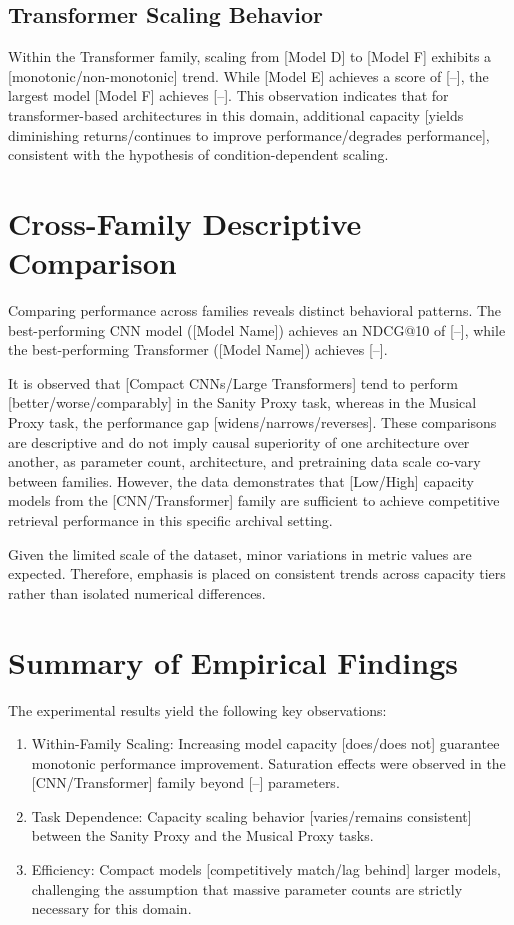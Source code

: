 \subsection{Transformer Scaling Behavior}
Within the Transformer family, scaling from [Model D] to [Model F] exhibits a [monotonic/non-monotonic] trend. While [Model E] achieves a score of [--], the largest model [Model F] achieves [--]. This observation indicates that for transformer-based architectures in this domain, additional capacity [yields diminishing returns/continues to improve performance/degrades performance], consistent with the hypothesis of condition-dependent scaling.

\section{Cross-Family Descriptive Comparison}

Comparing performance across families reveals distinct behavioral patterns. The best-performing CNN model ([Model Name]) achieves an NDCG@10 of [--], while the best-performing Transformer ([Model Name]) achieves [--].

It is observed that [Compact CNNs/Large Transformers] tend to perform [better/worse/comparably] in the Sanity Proxy task, whereas in the Musical Proxy task, the performance gap [widens/narrows/reverses]. These comparisons are descriptive and do not imply causal superiority of one architecture over another, as parameter count, architecture, and pretraining data scale co-vary between families. However, the data demonstrates that [Low/High] capacity models from the [CNN/Transformer] family are sufficient to achieve competitive retrieval performance in this specific archival setting.

Given the limited scale of the dataset, minor variations in metric values are expected. Therefore, emphasis is placed on consistent trends across capacity tiers rather than isolated numerical differences.

\section{Summary of Empirical Findings}

The experimental results yield the following key observations:

\begin{enumerate}
    \item Within-Family Scaling: Increasing model capacity [does/does not] guarantee monotonic performance improvement. Saturation effects were observed in the [CNN/Transformer] family beyond [--] parameters.
    \item Task Dependence: Capacity scaling behavior [varies/remains consistent] between the Sanity Proxy and the Musical Proxy tasks.
    \item Efficiency: Compact models [competitively match/lag behind] larger models, challenging the assumption that massive parameter counts are strictly necessary for this domain.
\end{enumerate}

